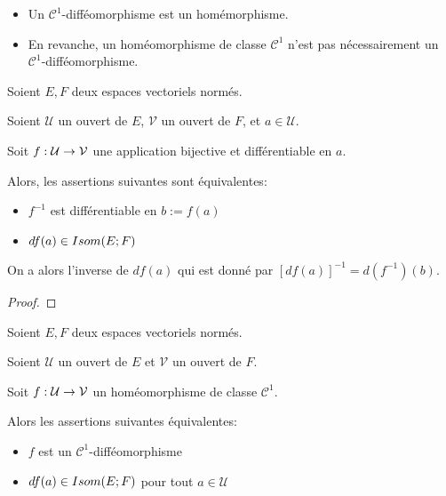 \begin{remarque}
	\begin{itemize}
		\item Un $\mathcal{C}^{1}$-difféomorphisme est un homémorphisme.
		\item En revanche, un homéomorphisme de classe $\mathcal{C}^{1}$ n'est
			pas nécessairement un $\mathcal{C}^{1}$-difféomorphisme.
	\end{itemize}
\end{remarque}

\begin{proposition}
	Soient $E, F$ deux espaces vectoriels normés.

	Soient $\mathcal{U}$ un ouvert de $E$, $\mathcal{V}$ un ouvert de $F$, et
	$a \in \mathcal{U}$.

	Soit $f : \mathcal{U} \rightarrow \mathcal{V}$ une application bijective et
	différentiable en $a$.

	Alors, les assertions suivantes sont équivalentes:

	\begin{itemize}
		\item $f^{-1}$ est différentiable en $b := f(a)$
		\item $df(a) \in Isom(E; F)$
	\end{itemize}

	On a alors l'inverse de $df(a)$ qui est donné par $[{df(a)}]^{-1} =
	d(f^{-1})(b)$.
\end{proposition}

\ifdefined\outputproof
\begin{proof}

\end{proof}
\fi

\begin{proposition}
	\label{prop:homeo_diffeo_ssi_dfx_isom}
	Soient $E, F$ deux espaces vectoriels normés.

	Soient $\mathcal{U}$ un ouvert de $E$ et $\mathcal{V}$ un ouvert de $F$.

	Soit $f : \mathcal{U} \rightarrow \mathcal{V}$ un homéomorphisme de classe
	$\mathcal{C}^{1}$.

	Alors les assertions suivantes équivalentes:

	\begin{itemize}
		\item $f$ est un $\mathcal{C}^{1}$-difféomorphisme
		\item $df(a) \in Isom(E; F)$ pour tout $a \in \mathcal{U}$
	\end{itemize}
\end{proposition}

